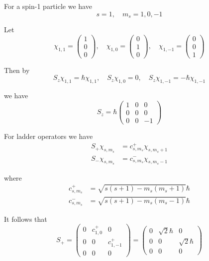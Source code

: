 


\bigskip
For a spin-1 particle we have
\begin{equation*}
s=1,\quad m_s=1,0,-1
\end{equation*}

Let
\begin{equation*}
\chi_{1,1}=\begin{pmatrix}1\\0\\0\end{pmatrix},
\quad
\chi_{1,0}=\begin{pmatrix}0\\1\\0\end{pmatrix},
\quad
\chi_{1,-1}=\begin{pmatrix}0\\0\\1\end{pmatrix}
\end{equation*}

Then by
\begin{equation*}
S_z\chi_{1,1}=\hbar\chi_{1,1},
\quad
S_z\chi_{1,0}=0,
\quad
S_z\chi_{1,-1}=-\hbar\chi_{1,-1}
\end{equation*}

we have
\begin{equation*}
S_z=\hbar\begin{pmatrix}1&0&0\\0&0&0\\0&0&-1\end{pmatrix}
\end{equation*}

For ladder operators we have
\begin{align*}
S_+\chi_{s,m_s}&=c_{s,m_s}^+\chi_{s,m_s+1}
\\
S_-\chi_{s,m_s}&=c_{s,m_s}^-\chi_{s,m_s-1}
\end{align*}

where
\begin{align*}
c_{s,m_s}^+&=\sqrt{s(s+1)-m_s(m_s+1)}\hbar
\\
c_{s,m_s}^-&=\sqrt{s(s+1)-m_s(m_s-1)}\hbar
\end{align*}

It follows that
\begin{equation*}
S_+=\begin{pmatrix}
0 & c_{1,0}^+ & 0
\\
0 & 0 & c_{1,-1}^+
\\
0 & 0 & 0
\end{pmatrix}
=\begin{pmatrix}
0 & \sqrt2\hbar & 0
\\
0 & 0 & \sqrt2\hbar
\\
0 & 0 & 0
\end{pmatrix}
\end{equation*}


